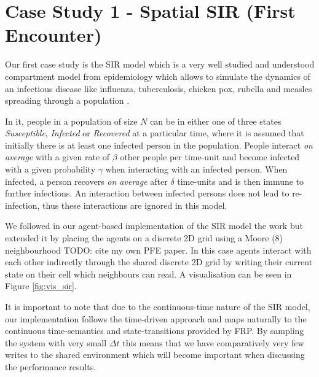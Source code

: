 \section{Case Study 1 - Spatial SIR (First Encounter)} 
\label{sec:cs_sir}

Our first case study is the SIR model which is a very well studied and understood compartment model from epidemiology \cite{kermack_contribution_1927} which allows to simulate the dynamics of an infectious disease like influenza, tuberculosis, chicken pox, rubella and measles spreading through a population \cite{enns_its_2010}.

In it, people in a population of size $N$ can be in either one of three states \textit{Susceptible}, \textit{Infected} or \textit{Recovered} at a particular time, where it is assumed that initially there is at least one infected person in the population. People interact \textit{on average} with a given rate of $\beta$ other people per time-unit and become infected with a given probability $\gamma$ when interacting with an infected person. When infected, a person recovers \textit{on average} after $\delta$ time-units and is then immune to further infections. An interaction between infected persons does not lead to re-infection, thus these interactions are ignored in this model. 

We followed in our agent-based implementation of the SIR model the work \cite{macal_agent-based_2010} but extended it by placing the agents on a discrete 2D grid using a Moore (8) neighbourhood TODO: cite my own PFE paper. In this case agents interact with each other indirectly through the shared discrete 2D grid by writing their current state on their cell which neighbours can read. A visualisation can be seen in Figure \ref{fig:vis_sir}.

It is important to note that due to the continuous-time nature of the SIR model, our implementation follows the time-driven \cite{meyer_event-driven_2014} approach and maps naturally to the continuous time-semantics and state-transitions provided by FRP. By sampling the system with very small $\Delta t$ this means that we have comparatively very few writes to the shared environment which will become important when discussing the performance results.


